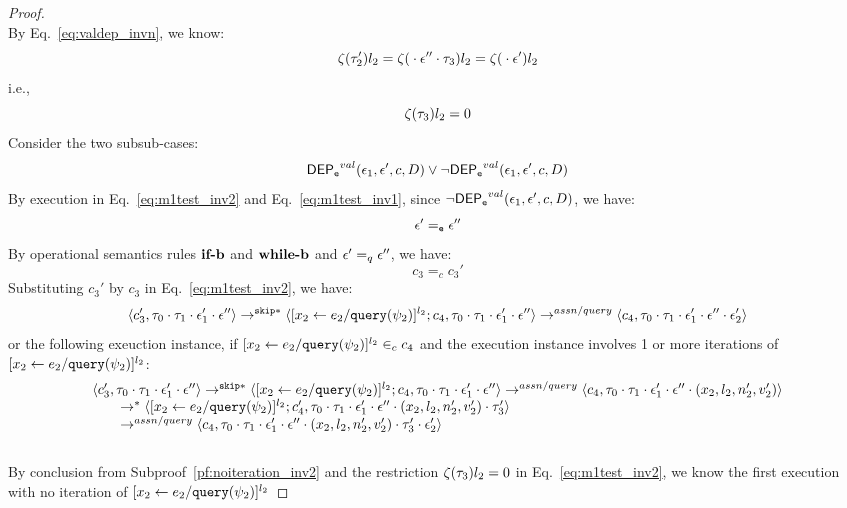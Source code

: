 {\begin{proof}
\begin{equation}
\end{equation}
By Eq.~\ref{eq:valdep_invn}, we know:
%
\[
\mathtt{\zeta}(\mathtt{\tau}_2') l_2  = \mathtt{\zeta}({} \cdot {} \mathtt{\epsilon}'' \cdot \mathtt{\tau}_3) l_2 = \mathtt{\zeta}({} \cdot {} \mathtt{\epsilon}') l_2 
 \]
i.e., 
\[
  \mathtt{\zeta}(\mathtt{\tau}_3) l_2 = 0
\]
Consider the two subsub-cases: 
%
$$
\mathsf{DEP_{\mathtt{e}}}^{val}(\mathtt{\epsilon}_1, \mathtt{\epsilon}', c, D) \lor \neg\mathsf{DEP_{\mathtt{e}}}^{val}(\mathtt{\epsilon}_1, \mathtt{\epsilon}', c, D)
$$
%
By execution in Eq.~\ref{eq:m1test_inv2} and Eq.~\ref{eq:m1test_inv1}, 
since $\neg\mathsf{DEP_{\mathtt{e}}}^{val}(\mathtt{\epsilon}_1, \mathtt{\epsilon}', c, D)$, we have:
\[
  \mathtt{\epsilon}' =_{\mathtt{e}} \mathtt{\epsilon}''
\]
By operational semantics rules $\rname{if-b}$ and $\rname{while-b}$ and $\mathtt{\epsilon}' =_q \mathtt{\epsilon}''$, we have:
\[
 c_3 =_c c_3'
\]
%
Substituting $c_3'$ by $c_3$ in Eq.~\ref{eq:m1test_inv2}, we have:
\[
  \langle c_3', \mathtt{\tau}_0 \cdot \mathtt{\tau}_1 \cdot \mathtt{\epsilon}_1' \cdot \mathtt{\epsilon}'' \rangle 
  \rightarrow^{\mathtt{skip}*} 
  \langle [\mathrel{ {x}_2 \leftarrow e_2 / {\tt query}(\psi_2) }]^{l_2};{c}_4, 
  \mathtt{\tau}_0 \cdot \mathtt{\tau}_1 \cdot \mathtt{\epsilon}_1' \cdot \mathtt{\epsilon}'' \rangle
  \rightarrow^{assn/query} 
  \langle {c}_4,  \mathtt{\tau}_0 \cdot \mathtt{\tau}_1 \cdot \mathtt{\epsilon}_1' \cdot \mathtt{\epsilon}'' \cdot \mathtt{\epsilon}_2' \rangle 
\]
%
or the following exeuction instance, 
if $[\mathrel{ {x}_2 \leftarrow e_2 / {\tt query}(\psi_2) }]^{l_2} \in_c c_4$ and 
the execution instance involves 1 or more iterations of $[\mathrel{ {x}_2 \leftarrow e_2 / {\tt query}(\psi_2) }]^{l_2}$:
%
\[
 \begin{array}{l}
  \langle c_3', \mathtt{\tau}_0 \cdot \mathtt{\tau}_1 \cdot \mathtt{\epsilon}_1' \cdot \mathtt{\epsilon}'' \rangle 
  \rightarrow^{\mathtt{skip}*} 
  \langle [\mathrel{ {x}_2 \leftarrow e_2 / {\tt query}(\psi_2) }]^{l_2};{c}_4, 
  \mathtt{\tau}_0 \cdot \mathtt{\tau}_1 \cdot \mathtt{\epsilon}_1' \cdot \mathtt{\epsilon}'' \rangle
  \rightarrow^{assn/query} 
  \langle {c}_4,  \mathtt{\tau}_0 \cdot \mathtt{\tau}_1 \cdot \mathtt{\epsilon}_1' \cdot \mathtt{\epsilon}'' \cdot (x_2, l_2, n_2', v_2') \rangle 
  \\ \qquad 
  \rightarrow^{*} 
  \langle [\mathrel{ {x}_2 \leftarrow e_2 / {\tt query}(\psi_2) }]^{l_2};{c}_4', 
  \mathtt{\tau}_0 \cdot \mathtt{\tau}_1 \cdot \mathtt{\epsilon}_1' \cdot \mathtt{\epsilon}''\cdot (x_2, l_2, n_2', v_2') \cdot \mathtt{\tau}_3' \rangle
  \\ \qquad 
  \rightarrow^{assn/query} 
  \langle {c}_4,  \mathtt{\tau}_0 \cdot \mathtt{\tau}_1 \cdot \mathtt{\epsilon}_1' \cdot \mathtt{\epsilon}'' \cdot (x_2, l_2, n_2', v_2')\cdot \mathtt{\tau}_3' \cdot \mathtt{\epsilon}_2' \rangle 
 \end{array} 
\]
%
\\
By conclusion from Subproof~\ref{pf:noiteration_inv2} and the restriction $\mathtt{\zeta}(\mathtt{\tau}_3) l_2 = 0$ in Eq.~\ref{eq:m1test_inv2}, 
we know
the first execution with no iteration of $[\mathrel{ {x}_2 \leftarrow e_2 / {\tt query}(\psi_2) }]^{l_2}$ 

\end{proof}}
